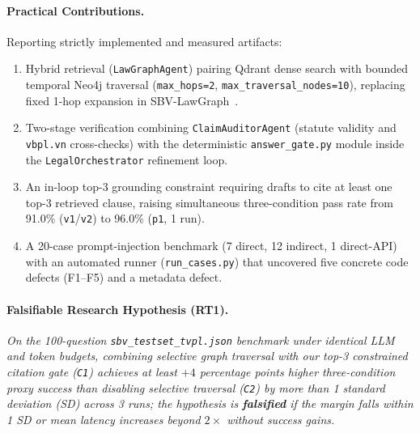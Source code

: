 \documentclass[sigconf,nonacm]{acmart}
\begin{document}
\paragraph{Practical Contributions.}
Reporting strictly implemented and measured artifacts:
\begin{enumerate}[leftmargin=*]
  \item Hybrid retrieval (\texttt{LawGraphAgent}) pairing Qdrant dense search with bounded temporal Neo4j traversal (\texttt{max\_hops=2}, \texttt{max\_traversal\_nodes=10}), replacing fixed 1-hop expansion in SBV-LawGraph~\cite{phan2026sbv}.
  \item Two-stage verification combining \texttt{ClaimAuditorAgent} (statute validity and \texttt{vbpl.vn} cross-checks) with the deterministic \texttt{answer\_gate.py} module inside the \texttt{LegalOrchestrator} refinement loop.
  \item An in-loop top-3 grounding constraint requiring drafts to cite at least one top-3 retrieved clause, raising simultaneous three-condition pass rate from 91.0\% (\texttt{v1}/\texttt{v2}) to 96.0\% (\texttt{p1}, 1 run).
  \item A 20-case prompt-injection benchmark (7 direct, 12 indirect, 1 direct-API) with an automated runner (\texttt{run\_cases.py}) that uncovered five concrete code defects (F1--F5) and a metadata defect.
\end{enumerate}

\paragraph{Falsifiable Research Hypothesis (RT1).}
\emph{On the 100-question \texttt{sbv\_testset\_tvpl.json} benchmark under identical LLM and token budgets, combining selective graph traversal with our top-3 constrained citation gate (\texttt{C1}) achieves at least $+4$ percentage points higher three-condition proxy success than disabling selective traversal (\texttt{C2}) by more than 1 standard deviation (SD) across 3 runs; the hypothesis is \textbf{falsified} if the margin falls within 1 SD or mean latency increases beyond $2\times$ without success gains.}
\end{document}
